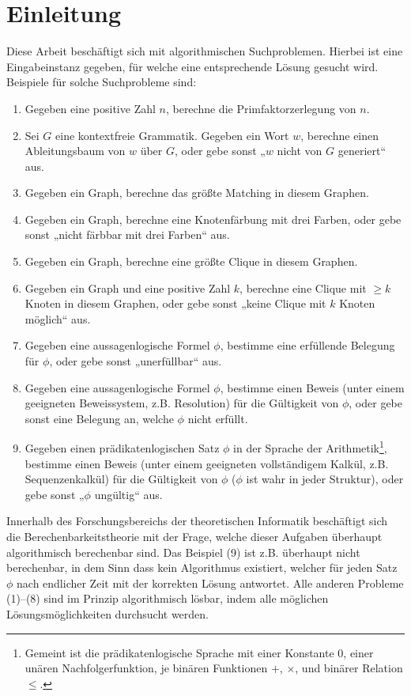 \chapter{Einleitung}

Diese Arbeit beschäftigt sich mit algorithmischen Suchproblemen. 
Hierbei ist eine Eingabeinstanz gegeben, für welche eine entsprechende Lösung gesucht wird.
Beispiele für solche Suchprobleme sind:
\begin{enumerate}[label=\arabic*.,beginpenalty=0,midpenalty=0]
    \item Gegeben eine positive Zahl $n$, berechne die Primfaktorzerlegung von $n$.
    \item Sei $G$ eine kontextfreie Grammatik. Gegeben ein Wort $w$, berechne einen Ableitungsbaum von $w$ über $G$, oder gebe sonst „$w$ nicht von $G$ generiert“ aus.
    \item Gegeben ein Graph, berechne das größte Matching in diesem Graphen.
    \item Gegeben ein Graph, berechne eine Knotenfärbung mit drei Farben, oder gebe sonst „nicht färbbar mit drei Farben“ aus.
    \item Gegeben ein Graph, berechne eine größte Clique in diesem Graphen.
    \item Gegeben ein Graph und eine positive Zahl $k$, berechne eine Clique mit $\geq k$ Knoten in diesem Graphen, oder gebe sonst „keine Clique mit $k$ Knoten möglich“ aus.
    \item Gegeben eine aussagenlogische Formel $\phi$, bestimme eine erfüllende Belegung für $\phi$, oder gebe sonst „unerfüllbar“ aus.
    \item Gegeben eine aussagenlogische Formel $\phi$, bestimme einen Beweis (unter einem geeigneten Beweissystem, z.B. Resolution) für die Gültigkeit von $\phi$, oder gebe sonst eine Belegung an, welche $\phi$ nicht erfüllt.
    \item Gegeben einen prädikatenlogischen Satz $\phi$ in der Sprache der Arithmetik\footnote{Gemeint ist die prädikatenlogische Sprache mit einer Konstante $0$, einer unären Nachfolgerfunktion, je binären Funktionen $+$, $\times$, und binärer Relation $\leq$.}, bestimme einen Beweis (unter einem geeigneten vollständigem Kalkül, z.B. Sequenzenkalkül) für die Gültigkeit von $\phi$ ($\phi$ ist wahr in jeder Struktur), oder gebe sonst „$\phi$ ungültig“ aus.
\end{enumerate}
Innerhalb des Forschungsbereichs der theoretischen Informatik beschäftigt sich die Berechenbarkeitstheorie mit der Frage, welche dieser Aufgaben überhaupt algorithmisch berechenbar sind. Das Beispiel (9) ist z.B. überhaupt nicht berechenbar, in dem Sinn dass kein Algorithmus existiert, welcher für jeden Satz $\phi$ nach endlicher Zeit mit der korrekten Lösung antwortet.
Alle anderen Probleme (1)–(8) sind im Prinzip algorithmisch lösbar, indem alle möglichen Lösungsmöglichkeiten durchsucht werden.

